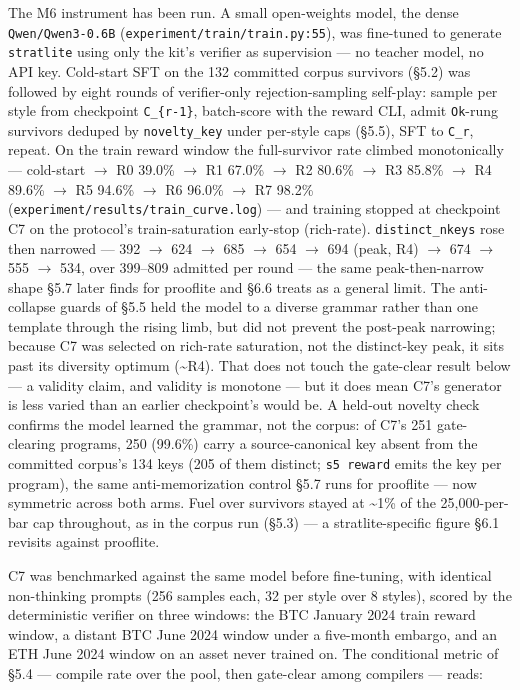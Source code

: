 \documentclass[11pt]{article}
\newcommand{\code}[1]{\texttt{#1}}
\begin{document}
The M6 instrument has been run. A small open-weights model, the dense
\code{Qwen/Qwen3-0.6B} (\code{experiment/train/train.py:55}), was fine-tuned to generate
\code{stratlite} using only the kit's verifier as supervision --- no teacher model, no
API key. Cold-start SFT on the 132 committed corpus survivors (\S{}5.2) was
followed by eight rounds of verifier-only rejection-sampling self-play: sample
per style from checkpoint \code{C\_\{r-1\}}, batch-score with the reward CLI, admit
\code{Ok}-rung survivors deduped by \code{novelty\_key} under per-style caps (\S{}5.5), SFT to
\code{C\_r}, repeat. On the train reward window the full-survivor rate climbed
monotonically --- cold-start $\rightarrow$ R0 39.0\% $\rightarrow$ R1 67.0\% $\rightarrow$ R2 80.6\% $\rightarrow$ R3 85.8\% $\rightarrow$ R4
89.6\% $\rightarrow$ R5 94.6\% $\rightarrow$ R6 96.0\% $\rightarrow$ R7 98.2\% (\code{experiment/results/train\_curve.log}) ---
and training stopped at checkpoint C7 on the protocol's train-saturation
early-stop (rich-rate). \code{distinct\_nkeys} rose then narrowed --- 392 $\rightarrow$ 624 $\rightarrow$ 685 $\rightarrow$
654 $\rightarrow$ 694 (peak, R4) $\rightarrow$ 674 $\rightarrow$ 555 $\rightarrow$ 534, over 399--809 admitted per round --- the
same peak-then-narrow shape \S{}5.7 later finds for prooflite and \S{}6.6 treats as a
general limit. The anti-collapse guards of \S{}5.5 held the model to a diverse
grammar rather than one template through the rising limb, but did not prevent the
post-peak narrowing; because C7 was selected on rich-rate saturation, not the
distinct-key peak, it sits past its diversity optimum (\textasciitilde{}R4). That does not touch
the gate-clear result below --- a validity claim, and validity is monotone --- but
it does mean C7's generator is less varied than an earlier checkpoint's would be.
A held-out novelty check confirms the model learned the grammar, not the corpus:
of C7's 251 gate-clearing programs, 250 (99.6\%) carry a source-canonical key
absent from the committed corpus's 134 keys (205 of them distinct; \code{s5 reward}
emits the key per program), the same anti-memorization control \S{}5.7 runs for
prooflite --- now symmetric across both arms.
Fuel over survivors stayed at \textasciitilde{}1\% of the 25,000-per-bar cap throughout, as in the
corpus run (\S{}5.3) --- a stratlite-specific figure \S{}6.1 revisits against prooflite.

C7 was benchmarked against the same model before fine-tuning, with identical
non-thinking prompts (256 samples each, 32 per style over 8 styles), scored by
the deterministic verifier on three windows: the BTC January 2024 train reward
window, a distant BTC June 2024 window under a five-month embargo, and an ETH
June 2024 window on an asset never trained on. The conditional metric of \S{}5.4 ---
compile rate over the pool, then gate-clear among compilers --- reads:
\end{document}
